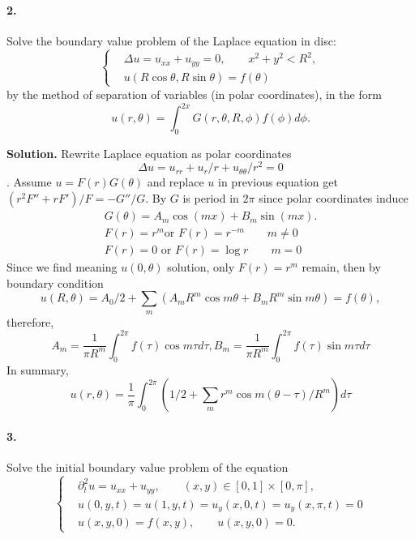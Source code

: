 \documentclass[a4paper]{book}
\newenvironment{solution}%
{\noindent\textbf{Solution.}}%
{\qedhere}
\numberwithin{equation}{chapter}
\theoremstyle{definition}
\begin{document}
\paragraph*{2. }
Solve the boundary value problem of the Laplace equation in disc:
\begin{equation}
    \left\{
    \begin{aligned}
         & \Delta u = u_{xx} + u_{yy} = 0, \qquad x^2 + y^2 < R^2, \\
         & u(R \cos \theta, R \sin \theta) = f(\theta)
    \end{aligned}
    \right.
\end{equation}
by the method of separation of variables (in polar coordinates), in the form
\[ u(r, \theta) = \int_0^{2x} G(r, \theta, R, \phi) f(\phi) d\phi .\]

\begin{solution}
    Rewrite Laplace equation as polar coordinates 
    \[\Delta u = u_{rr} +u_{r}/r + u_{\theta \theta} / r^2 = 0 \].
    Assume $u = F(r)G(\theta)$ and replace $u$ in previous equation get 
    $(r^2 F'' + r F') / F = - G''/G$.
    By $G$ is period in $2\pi$ since polar coordinates induce 
    \begin{align*}
        G(\theta) = A_m \cos(mx) + B_m \sin(mx). \\
       F(r) = r^m  \text{or } F(r) = r^{-m}  \qquad m \neq 0 \\
       F(r) = 0 \text{  or } F(r) = \log r   \qquad m = 0
    \end{align*}
    Since we find meaning $ u(0, \theta)$ solution, 
    only $F(r) = r^m$ remain, then by boundary condition 
    \[u(R, \theta) = A_0 / 2 + \sum_{m} (A_m R^m \cos m\theta + B_m R^m \sin m\theta) = f(\theta), \]
    therefore,
    \[A_m = \frac{1}{\pi R^m} \int_0^{2 \pi} f(\tau) \cos m \tau d \tau, 
     B_m = \frac{1}{\pi R^m} \int_0^{2 \pi} f(\tau) \sin m \tau d \tau\]
     In summary,
     \[u(r, \theta) = \frac{1}{\pi} \int_0^{2 \pi} \left(
         1/2 + \sum_{m} r^m \cos m(\theta - \tau) / R^m
     \right)  d\tau \]
\end{solution}

\paragraph*{3. }
Solve the initial boundary value problem of the equation
\begin{equation}
    \left\{
    \begin{aligned}
         & \partial_t^2 u = u_{xx} +u_{yy}, \qquad (x, y) \in [0,1] \times [0, \pi], \\
         & u(0, y, t) = u(1, y, t) = u_y(x, 0, t) = u_y(x, \pi, t) = 0               \\
         & u(x, y, 0) = f(x, y), \qquad u(x, y, 0) = 0.
    \end{aligned}
    \right.
\end{equation}
\end{document}
